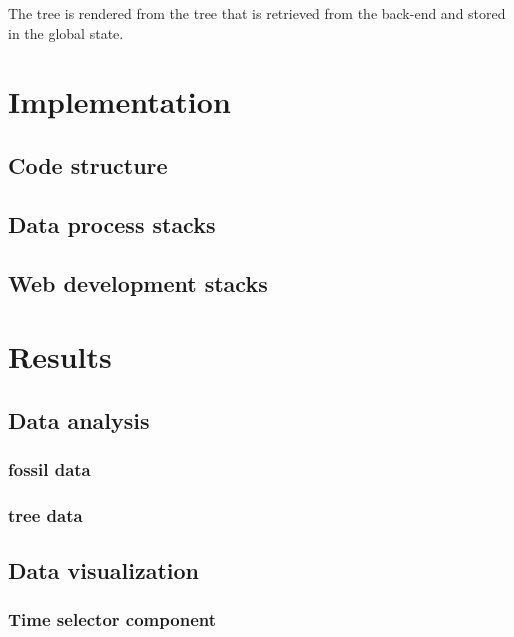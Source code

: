 \documentclass[11pt, a4paper,oneside,chapterprefix=false]{scrbook}
\begin{document}
The tree is rendered from the tree that is retrieved from the back-end and stored in the global state. 

\chapter{Implementation} \label{chp:implementation}
\section{Code structure} \label{sec:implementation_code_structure}
\section{Data process stacks}\label{sec:implementation_data_processing}
\section{Web development stacks}\label{sec:implementation_web_development}

\chapter{Results} \label{chp:results}
\section{Data analysis} \label{sec:result_data_analysis}
\subsection{fossil data} \label{subsec:data_analysis_fossil}
\subsection{tree data} \label{subsec:data_analysis_tree}

\section{Data visualization} \label{sec:result_data_visualization}
\subsection{Time selector component} \label{subsec:data_visualization_time}
\end{document}
